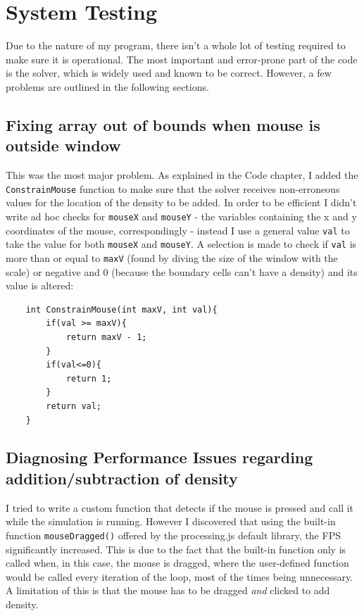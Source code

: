 \documentclass[12pt,a4paper]{book}
\begin{document}
\chapter{System Testing}
Due to the nature of my program, there isn't a whole lot of testing required to make sure it is operational. The most important and error-prone part of the code is the solver, which is widely used and known to be correct. However, a few problems are outlined in the following sections. 

\section{Fixing array out of bounds when mouse is outside window}
This was the most major problem. As explained in the Code chapter, I added the \verb|ConstrainMouse| function to make sure that the solver receives non-erroneous values for the location of the density to be added. In order to be efficient I didn't write ad hoc checks for \verb|mouseX| and \verb|mouseY| - the variables containing the x and y coordinates of the mouse, correspondingly - instead I use a general value \verb|val| to take the value for both \verb|mouseX| and \verb|mouseY|. A selection is made to check if \verb|val| is more than or equal to \verb|maxV| (found by diving the size of the window with the scale) or negative and 0 (because the boundary cells can't have a density) and its value is altered:\\
\begin{lstlisting}
	int ConstrainMouse(int maxV, int val){
		if(val >= maxV){
			return maxV - 1;
		}
		if(val<=0){
			return 1; 
		}
		return val;
	}
\end{lstlisting}

\section{Diagnosing Performance Issues regarding addition/subtraction of density}
I tried to write a custom function that detects if the mouse is pressed and call it while the simulation is running. However I discovered that using the built-in function \verb|mouseDragged()| offered by the processing.js default library, the FPS significantly increased. This is due to the fact that the built-in function only is called when, in this case, the mouse is dragged, where the user-defined function would be called every iteration of the loop, most of the times being unnecessary. A limitation of this is that the mouse has to be dragged \emph{and} clicked to add density.\\
\end{document}
